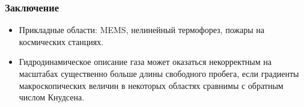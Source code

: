 \documentclass[mathserif]{beamer} %
\begin{document}
\begin{frame}
    \frametitle{Заключение}
    \begin{itemize}
        \item Прикладные области: MEMS, нелинейный термофорез, пожары на космических станциях.
        \item Гидродинамическое описание газа может оказаться некорректным на масштабах существенно больше длины свободного пробега,
        если градиенты макроскопических величин в некоторых областях сравнимы с обратным числом Кнудсена.
    \end{itemize}
\end{frame}
\end{document}
